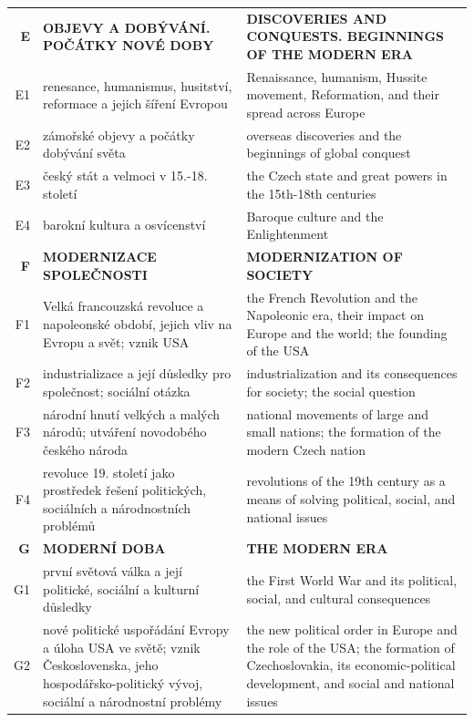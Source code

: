 \documentclass[]{interact}
\theoremstyle{plain}%
\theoremstyle{definition}
\theoremstyle{remark}
\begin{document}
\begin{table}
{\begin{tabular}{r|p{10cm}|p{10cm}}
\textbf{E} & \textbf{OBJEVY A DOBÝVÁNÍ. POČÁTKY NOVÉ DOBY} & \textbf{DISCOVERIES AND CONQUESTS. BEGINNINGS OF THE MODERN ERA} \\ 
E1 & renesance, humanismus, husitství, reformace a jejich šíření Evropou & Renaissance, humanism, Hussite movement, Reformation, and their spread across Europe \\ 
E2 & zámořské objevy a počátky dobývání světa & overseas discoveries and the beginnings of global conquest \\ 
E3 & český stát a velmoci v 15.-18. století & the Czech state and great powers in the 15th-18th centuries \\ 
E4 & barokní kultura a osvícenství & Baroque culture and the Enlightenment \\ \hline

\textbf{F} & \textbf{MODERNIZACE SPOLEČNOSTI} & \textbf{MODERNIZATION OF SOCIETY} \\ 
F1 & Velká francouzská revoluce a napoleonské období, jejich vliv na Evropu a svět; vznik USA & the French Revolution and the Napoleonic era, their impact on Europe and the world; the founding of the USA \\ 
F2 & industrializace a její důsledky pro společnost; sociální otázka & industrialization and its consequences for society; the social question \\ 
F3 & národní hnutí velkých a malých národů; utváření novodobého českého národa & national movements of large and small nations; the formation of the modern Czech nation \\ 
F4 & revoluce 19. století jako prostředek řešení politických, sociálních a národnostních problémů & revolutions of the 19th century as a means of solving political, social, and national issues \\ \hline

\textbf{G} & \textbf{MODERNÍ DOBA} & \textbf{THE MODERN ERA} \\ 
G1 & první světová válka a její politické, sociální a kulturní důsledky & the First World War and its political, social, and cultural consequences \\ 
G2 & nové politické uspořádání Evropy a úloha USA ve světě; vznik Československa, jeho hospodářsko-politický vývoj, sociální a národnostní problémy & the new political order in Europe and the role of the USA; the formation of Czechoslovakia, its economic-political development, and social and national issues \\ \hline


\end{tabular}}
\end{table}
\end{document}

